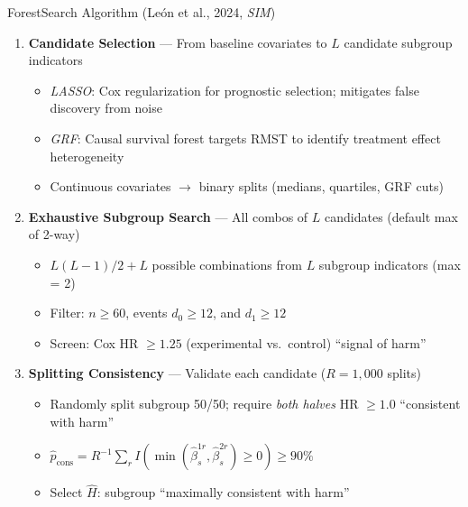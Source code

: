 \documentclass[
  ignorenonframetext,
  aspectratio=169]{beamer}
\begin{document}
\begin{frame}{ForestSearch Algorithm (León et al., 2024, \emph{SIM})}
\label{forestsearch-algorithm-leuxf3n-et-al.-2024}
\begin{enumerate}
\item \textbf{Candidate Selection} --- From baseline covariates to $L$ candidate subgroup indicators
  \begin{itemize}
  \item \textit{LASSO}: Cox regularization for prognostic selection; mitigates false discovery from noise
  \item \textit{GRF}: Causal survival forest targets RMST to identify treatment effect heterogeneity
  \item Continuous covariates $\rightarrow$ binary splits (medians, quartiles, GRF cuts)
  \end{itemize}

\item \textbf{Exhaustive Subgroup Search} --- All combos of $L$ candidates (default max of 2-way)
  \begin{itemize}
  \item $L(L-1)/2 + L$ possible combinations from $L$ subgroup indicators (max = 2)
  \item Filter: $n \geq 60$, events $d_0 \geq 12$, and $d_1 \geq 12$
  \item Screen: Cox HR $\geq 1.25$ (experimental vs.\ control) ``signal of harm''
  \end{itemize}

\item \textbf{Splitting Consistency} --- Validate each candidate ($R = 1,000$ splits)
  \begin{itemize}
  \item Randomly split subgroup 50/50; require \emph{both halves} HR $\geq 1.0$ ``consistent with harm''
  \item $\hat{p}_{\text{cons}} = R^{-1}\sum_{r} I(\min(\hat{\beta}_s^{1r}, \hat{\beta}_s^{2r}) \geq 0) \geq 90\%$
  \item Select $\widehat{H}$: subgroup ``maximally consistent with harm''
  \end{itemize}
\end{enumerate}
\end{frame}
\end{document}
